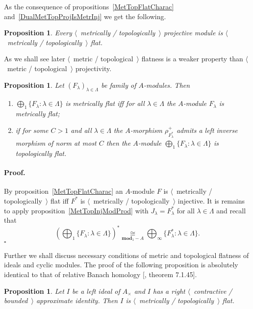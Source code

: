 \documentclass[12pt]{article}
\newcommand{\isom}[1]{\mathop{\mathbin{\cong}}\limits_{#1}}
\newtheorem{proposition}[theorem]{Proposition}
\renewenvironment{proof}{\paragraph{Proof.}}{\hfill$\square$\medskip}
\begin{document}
As the consequence of propositions~\ref{MetTopFlatCharac}
and~\ref{DualMetTopProjIsMetrInj} we get the following.

\begin{proposition}\label{MetTopProjIsMetTopFlat} Every $\langle$~metrically /
    topologically~$\rangle$ projective module is $\langle$~metrically /
    topologically~$\rangle$ flat.
\end{proposition}

As we shall see later $\langle$~metric / topological~$\rangle$ flatness is a
weaker property than $\langle$~metric / topological~$\rangle$ projectivity.

\begin{proposition}\label{MetTopFlatModCoProd} Let
    ${(F_\lambda)}_{\lambda\in\Lambda}$ be family of $A$-modules. Then
    \begin{enumerate}
        \item $\bigoplus_1 \{F_\lambda:\lambda\in\Lambda \}$ is metrically flat
              iff for all $\lambda\in\Lambda$ the $A$-module $F_\lambda$ is
              metrically flat;

        \item if for some $C>1$ and all $\lambda\in\Lambda$ the $A$-morphism
              $\rho_{F_\lambda^*}^+$ admits a left inverse morphism of norm at
              most $C$ then the $A$-module
              $\bigoplus_1\{F_\lambda:\lambda\in\Lambda \}$ is topologically
              flat.
    \end{enumerate}
\end{proposition}
\begin{proof} By proposition~\ref{MetTopFlatCharac} an $A$-module $F$ is
    $\langle$~metrically / topologically~$\rangle$ flat iff $F^*$ is
    $\langle$~metrically / topologically~$\rangle$ injective. It is remains to
    apply proposition~\ref{MetTopInjModProd} with $J_\lambda=F_\lambda^*$ for
    all $\lambda\in\Lambda$ and recall that
    $$
        {\left(\bigoplus_1 \{ F_\lambda:\lambda\in\Lambda \}\right)}^*
        \isom{\mathbf{mod}_1-A}
        \bigoplus_\infty \{ F_\lambda^*:\lambda\in\Lambda \}.
    $$
\end{proof}

Further we shall discuss necessary conditions of metric and topological flatness
of ideals and cyclic modules. The proof of the following proposition is
absolutely identical to that of relative Banach homology
    [\cite{HelBanLocConvAlg}, theorem 7.1.45].

\begin{proposition}\label{MetTopFlatIdealsInUnitalAlg} Let $I$ be a left ideal
    of $A_\times $ and $I$ has a right $\langle$~contractive / bounded~$\rangle$
    approximate identity. Then $I$ is $\langle$~metrically /
    topologically~$\rangle$ flat.
\end{proposition}
\end{document}
